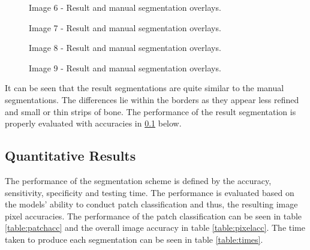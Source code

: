 \begin{figure}[H]
    \centering
    \quad
    \caption{Image 6 - Result and manual segmentation overlays.}%
    \label{fig:overlay6}
\end{figure}
 
 \begin{figure}[H]
    \centering
    \quad
    \caption{Image 7 - Result and manual segmentation overlays.}%
    \label{fig:overlay7}
\end{figure}

\begin{figure}[H]
    \centering
    \quad
    \caption{Image 8 - Result and manual segmentation overlays.}%
    \label{fig:overlay8}
\end{figure}

\begin{figure}[H]
    \centering
    \quad
    \caption{Image 9 - Result and manual segmentation overlays.}%
    \label{fig:overlay9}
\end{figure}
 
 It can be seen that the result segmentations are quite similar to the manual segmentations. The differences lie within the borders as they appear less refined and small or thin strips of bone. The performance of the result segmentation is properly evaluated with accuracies in \ref{sect:quant} below.
 
\subsection{Quantitative Results}
\label{sect:quant}
The performance of the segmentation scheme is defined by the accuracy, sensitivity, specificity and testing time. The performance is evaluated based on the models' ability to conduct patch classification and thus, the resulting image pixel accuracies. The performance of the patch classification can be seen in table \ref{table:patchacc} and the overall image accuracy in table \ref{table:pixelacc}. The time taken to produce each segmentation can be seen in table \ref{table:times}.



